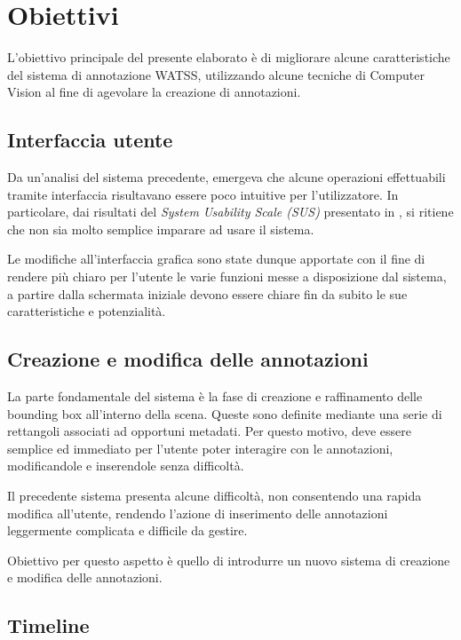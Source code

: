 \section{Obiettivi}

L'obiettivo principale del presente elaborato è di migliorare alcune caratteristiche del sistema di annotazione WATSS, utilizzando alcune tecniche di Computer Vision al fine di agevolare la creazione di annotazioni.

\subsection{Interfaccia utente}

Da un'analisi del sistema precedente, emergeva che alcune operazioni effettuabili tramite interfaccia risultavano essere poco intuitive per l'utilizzatore. In particolare, dai risultati del \emph{System Usability Scale (SUS)} presentato in \cite{Bartoli:2015:WWA:2733373.2807411}, si ritiene che non sia molto semplice imparare ad usare il sistema.

Le modifiche all'interfaccia grafica sono state dunque apportate con il fine di rendere più chiaro per l'utente le varie funzioni messe a disposizione dal sistema, a partire dalla schermata iniziale devono essere chiare fin da subito le sue caratteristiche e potenzialità.

\subsection{Creazione e modifica delle annotazioni}

La parte fondamentale del sistema è la fase di creazione e raffinamento delle bounding box all'interno della scena. Queste sono definite mediante una serie di rettangoli associati ad opportuni metadati. Per questo motivo, deve essere semplice ed immediato per l'utente poter interagire con le annotazioni, modificandole e inserendole senza difficoltà. 

Il precedente sistema presenta alcune difficoltà, non consentendo una rapida modifica all'utente, rendendo l'azione di inserimento delle annotazioni leggermente complicata e difficile da gestire.

Obiettivo per questo aspetto è quello di introdurre un nuovo sistema di creazione e modifica delle annotazioni.

\subsection{Timeline}

